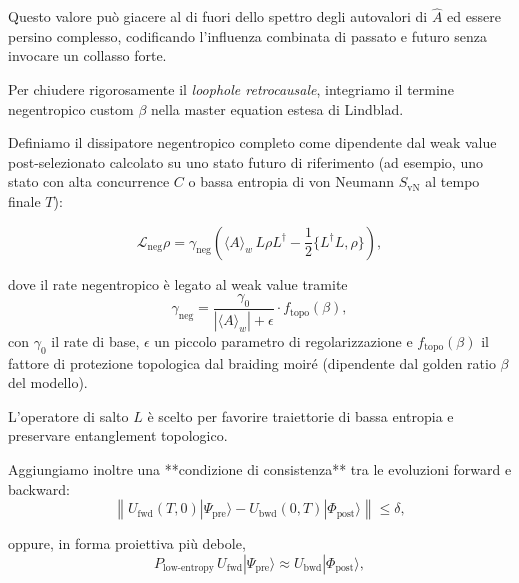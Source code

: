 \documentclass[11pt,a4paper]{article}
\theoremstyle{plain}
\theoremstyle{definition}
\begin{document}
Questo valore può giacere al di fuori dello spettro degli autovalori di \( \hat{A} \) ed essere persino complesso, codificando l'influenza combinata di passato e futuro senza invocare un collasso forte.


\vspace{0.4cm}

Per chiudere rigorosamente il \textit{loophole retrocausale}, integriamo il termine negentropico custom \( \beta \) nella master equation estesa di Lindblad. 


\vspace{0.3cm}

Definiamo il dissipatore negentropico completo come dipendente dal weak value post-selezionato calcolato su uno stato futuro di riferimento (ad esempio, uno stato con alta concurrence \( C \) o bassa entropia di von Neumann \( S_{\text{vN}} \) al tempo finale \( T \)):

\[
\mathcal{L}_{\text{neg}}\rho = \gamma_{\text{neg}} \left( \langle A \rangle_w \, L \rho L^\dagger - \frac{1}{2} \{ L^\dagger L, \rho \} \right),
\]


\vspace{0.3cm}

dove il rate negentropico è legato al weak value tramite
\[
\gamma_{\text{neg}} = \frac{\gamma_0}{|\langle A \rangle_w| + \epsilon} \cdot f_{\text{topo}}(\beta),
\]
con \( \gamma_0 \) il rate di base, \( \epsilon \) un piccolo parametro di regolarizzazione e \( f_{\text{topo}}(\beta) \) il fattore di protezione topologica dal braiding moiré (dipendente dal golden ratio \( \beta \) del modello). 


\vspace{0.3cm}




L'operatore di salto \( L \) è scelto per favorire traiettorie di bassa entropia e preservare entanglement topologico.


\vspace{0.4cm}

Aggiungiamo inoltre una **condizione di consistenza** tra le evoluzioni forward e backward:
\[
\left\| U_{\text{fwd}}(T,0) |\Psi_{\text{pre}}\rangle - U_{\text{bwd}}(0,T) |\Phi_{\text{post}}\rangle \right\| \leq \delta,
\]


\vspace{0.3cm}



oppure, in forma proiettiva più debole, 
\[
P_{\text{low-entropy}} \, U_{\text{fwd}} |\Psi_{\text{pre}}\rangle \approx U_{\text{bwd}} |\Phi_{\text{post}}\rangle,
\]
\end{document}
